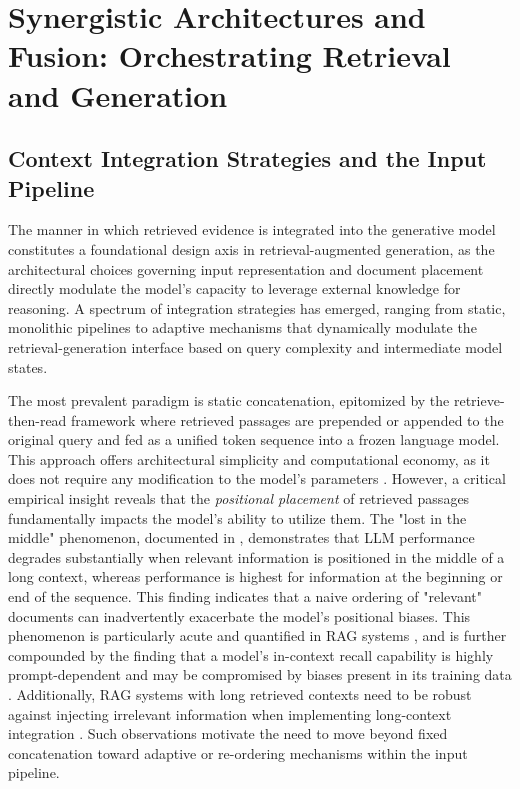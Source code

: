 \documentclass[11pt,a4paper]{article}
\begin{document}
\section{Synergistic Architectures and Fusion: Orchestrating Retrieval and Generation}



\subsection{Context Integration Strategies and the Input Pipeline}


The manner in which retrieved evidence is integrated into the generative model constitutes a foundational design axis in retrieval-augmented generation, as the architectural choices governing input representation and document placement directly modulate the model's capacity to leverage external knowledge for reasoning. A spectrum of integration strategies has emerged, ranging from static, monolithic pipelines to adaptive mechanisms that dynamically modulate the retrieval-generation interface based on query complexity and intermediate model states.

The most prevalent paradigm is static concatenation, epitomized by the retrieve-then-read framework where retrieved passages are prepended or appended to the original query and fed as a unified token sequence into a frozen language model. This approach offers architectural simplicity and computational economy, as it does not require any modification to the model's parameters \cite{arxiv:2005.11401v4}. However, a critical empirical insight reveals that the \emph{positional placement} of retrieved passages fundamentally impacts the model's ability to utilize them. The "lost in the middle" phenomenon, documented in \cite{arxiv:2307.03172v3}, demonstrates that LLM performance degrades substantially when relevant information is positioned in the middle of a long context, whereas performance is highest for information at the beginning or end of the sequence. This finding indicates that a naive ordering of "relevant" documents can inadvertently exacerbate the model's positional biases. This phenomenon is particularly acute and quantified in RAG systems \cite{arxiv:2402.13178v2}, and is further compounded by the finding that a model's in-context recall capability is highly prompt-dependent and may be compromised by biases present in its training data \cite{arxiv:2404.08865v1}. Additionally, RAG systems with long retrieved contexts need to be robust against injecting irrelevant information when implementing long-context integration \cite{arxiv:2307.03172v3}. Such observations motivate the need to move beyond fixed concatenation toward adaptive or re-ordering mechanisms within the input pipeline.
\end{document}
